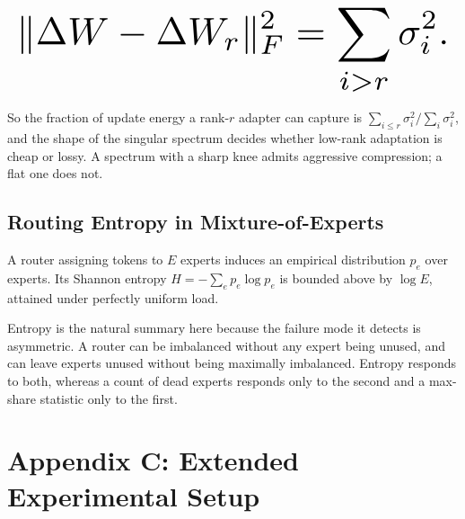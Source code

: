 \documentclass[10pt,twocolumn,letterpaper]{article}
\begin{document}
\begin{equation}
\resizebox{\columnwidth}{!}{$\displaystyle
\begin{aligned}
\|\Delta W - \Delta W_r\|_F^2 = \sum_{i > r} \sigma_i^2 .
\end{aligned}
$}
\end{equation}






So the fraction of update energy a rank-$r$ adapter can capture is $\sum_{i \le r} \sigma_i^2 / \sum_i \sigma_i^2$, and the shape of the singular spectrum decides whether low-rank adaptation is cheap or lossy. A spectrum with a sharp knee admits aggressive compression; a flat one does not.


\subsection{Routing Entropy in Mixture-of-Experts}


A router assigning tokens to $E$ experts induces an empirical distribution $p_e$ over experts. Its Shannon entropy $H = -\sum_e p_e \log p_e$ is bounded above by $\log E$, attained under perfectly uniform load.

Entropy is the natural summary here because the failure mode it detects is asymmetric. A router can be imbalanced without any expert being unused, and can leave experts unused without being maximally imbalanced. Entropy responds to both, whereas a count of dead experts responds only to the second and a max-share statistic only to the first.




\section{Appendix C: Extended Experimental Setup}
\end{document}
